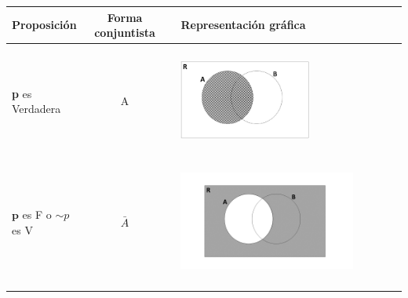 \documentclass[12pt]{article}
\theoremstyle{definition}
\theoremstyle{remark}
\begin{document}
\begin{enumerate}
\begin{table}[ H]
\begin{center} 
\begin{tabular} { l c c l }
\textbf{Proposición}&\textbf{Forma conjuntista}& & \textbf{Representación gráfica}\\ \hline  \\ 

\textbf{p} es Verdadera& A& & 
\begin{minipage}{5cm} 
\begin{center} 
\includegraphics[width=0.6\textwidth]{TP1Fig3.jpg} 
\end{center}
\end{minipage}\\ \\ 

$\textbf{p}$  es F o $\sim p $ es V &$\bar{A}$ & & 
\begin{minipage}{5cm} 
\begin{center} 
\includegraphics[width=0.8\textwidth]{11a.png} 
\end{center}
\end{minipage}\\ \\   

\end{tabular} 
\end{center} 
\end{table}


\end{enumerate}
\end{document}
